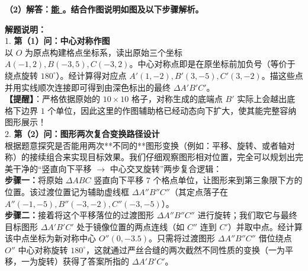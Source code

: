 \begin{center}
\end{center}

\vspace{0.6cm}

\textbf{（2）解答：\underline{\quad 能 \quad}。结合作图说明如图及以下步骤解析。}

\vspace{0.6cm}

{\small\color{gray}
\textbf{解题说明：}\\
1. \textbf{第（1）问：中心对称作图}\\
以 $O$ 为原点构建格点坐标系，读出原始三个坐标 $A(-1,2), B(-3,5), C(-3,2)$。中心对称点即是在原坐标前加负号（等价于绕点旋转 $180^\circ$）。经计算得对应点 $A'(1,-2), B'(3,-5), C'(3,-2)$。描这些点并用实线顺次连接即可得到由深色标出的最终 $\Delta A'B'C'$。\\
\textbf{【提醒】}：严格依据原始的 $10\times10$ 格子，对称生成的底端点 $B'$ 实际上会越出底格下边界 $1$ 个单位，因此这里的作图辅助格已经动态向下扩大，使其能完整容纳图形展示！\\
2. \textbf{第（2）问：图形两次复合变换路径设计}\\
根据题意探究是否能用两次**不同的**图形变换（例如：平移、旋转、或者轴对称）的接续组合来实现目标效果。我们仔细观察图形相对位置，完全可以规划出完美干净的“竖直向下平移 $\rightarrow$ 中心交叉旋转”两步复合逻辑：\\
\textbf{步骤一：}将原始 $\Delta ABC$ 竖直向下平移 $7$ 个格点单位，让图形来到第三象限下方的位置。该过渡位置记为辅助虚线框 $\Delta A''B''C''$（其定点落子在 $A''(-1,-5), B''(-3,-2), C''(-3,-5)$）。\\
\textbf{步骤二：}接着将这个平移落位的过渡图形 $\Delta A''B''C''$ 进行旋转；我们取它与最终目标图形 $\Delta A'B'C'$ 处于镜像位置的两点连线（如 $C''$ 连到 $C'$）并取中点。经计算该中点坐标为新对称中心 $O''(0, -3.5)$。只需将过渡图形 $\Delta A''B''C''$ 借位绕点 $O''$ 中心对称旋转 $180^\circ$，这就通过严丝合缝的两次截然不同性质的变换（一为平移，一为旋转）获得了答案所指的 $\Delta A'B'C'$。
}

